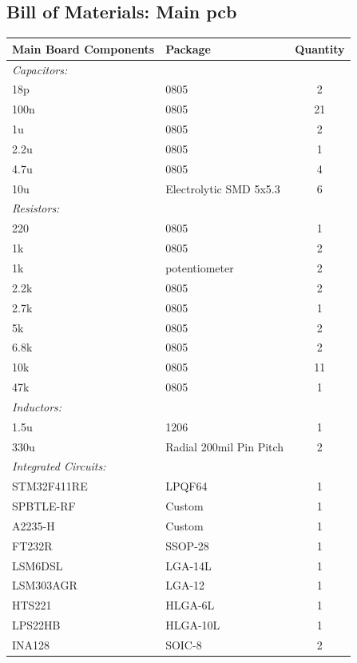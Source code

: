 \subsection{Bill of Materials: Main \gls{pcb}}
\begin{center}
\begin{tabular}{|l|l|c|}
	\hline
	\bf{Main Board Components} & \bf{Package} & \bf{Quantity} \\
	\hline
	\emph{Capacitors:} & & \\
	\hline
	18p & 0805 & 2 \\
	\hline
	100n & 0805 & 21 \\
	\hline
	1u & 0805 & 2 \\
	\hline 
	2.2u & 0805 & 1 \\
	\hline 
	4.7u & 0805 & 4 \\
	\hline 
	10u & Electrolytic SMD 5x5.3 & 6 \\
	\hline
	\emph{Resistors:} & & \\
	\hline
	220 & 0805 & 1 \\
	\hline
	1k & 0805 & 2 \\
	\hline
	1k & potentiometer & 2 \\
	\hline
	2.2k & 0805 & 2 \\
	\hline
	2.7k & 0805 & 1 \\
	\hline
	5k & 0805 & 2 \\
	\hline
	6.8k & 0805 & 2 \\
	\hline
	10k & 0805 & 11 \\
	\hline
	47k & 0805 & 1 \\
	\hline
	\emph{Inductors:} & & \\
	\hline
	1.5u & 1206 & 1 \\
	\hline 
	330u & Radial 200mil Pin Pitch & 2 \\
	\hline 
	\emph{Integrated Circuits:} & & \\
	\hline
	STM32F411RE & LPQF64 & 1 \\
	\hline 
	SPBTLE-RF & Custom & 1 \\
	\hline
	A2235-H & Custom & 1 \\
	\hline
	FT232R & SSOP-28 & 1 \\
	\hline
	LSM6DSL & LGA-14L & 1 \\
	\hline
	LSM303AGR & LGA-12 & 1 \\
	\hline
	HTS221 & HLGA-6L & 1 \\
	\hline
	LPS22HB & HLGA-10L & 1 \\
	\hline
	INA128 & SOIC-8 & 2 \\

\end{tabular}
\end{center}
